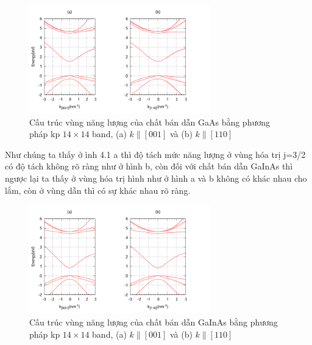 \begin{figure}[ht]
\centering
\includegraphics[width=0.70\textwidth]{./Figures/band-gaas.pdf}
\caption[computer kp 14-band GaAs]{Cấu trúc vùng năng lượng của chất bán dẫn GaAs bằng phương pháp kp $14\times14$ band, (a) $k\parallel[001]$ và (b) $k\parallel[110]$}
\label{fig:computer kp 14-band GaAs}
\end{figure}
Như chúng ta thấy ở ình 4.1 a thì độ tách mức năng lượng ở vùng hóa trị j=3/2 có độ tách không rõ ràng như ở hình b, còn đối với chất bán dẫn  GaInAs thì ngược lại ta thấy ở vùng hóa trị hình như ở hình a và b không có khác nhau cho lắm, còn ở vùng dẫn thì có sự khác nhau rõ ràng.
\begin{figure}[ht]
\centering
\includegraphics[width=0.70\textwidth]{./Figures/band-GaInAs.pdf}
\caption[computer kp 14-band GaInAs]{Cấu trúc vùng năng lượng của chất bán dẫn GaInAs bằng phương pháp kp $14\times14$ band, (a) $k\parallel[001]$ và (b) $k\parallel[110]$}
\end{figure}

